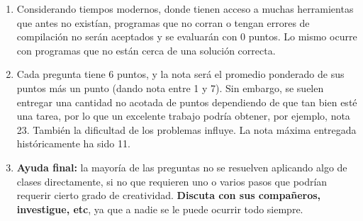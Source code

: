 \documentclass[a4paper,12 pt]{article}
\theoremstyle{definition}
\begin{document}
\begin{enumerate}
\item Considerando tiempos modernos, donde tienen acceso a muchas herramientas que antes no existían, programas que no corran o tengan errores de compilación no serán aceptados y se evaluarán con 0 puntos. Lo mismo ocurre con programas que no están cerca de una solución correcta.
\item Cada pregunta tiene 6 puntos, y la nota será el promedio ponderado de sus puntos más un punto (dando nota entre 1 y 7). Sin embargo, se suelen entregar una cantidad no acotada de puntos dependiendo de que tan bien esté una tarea, por lo que un excelente trabajo podría obtener, por ejemplo, nota 23. También la dificultad de los problemas influye. La nota máxima entregada históricamente ha sido 11.
\item \textbf{Ayuda final:} la mayoría de las preguntas no se resuelven aplicando algo de clases directamente, si no que requieren uno o varios pasos que podrían requerir cierto grado de creatividad. \textbf{Discuta con sus compañeros, investigue, etc}, ya que a nadie se le puede ocurrir todo siempre.

\end{enumerate}
\newpage
\end{document}
